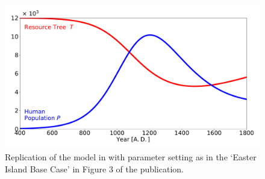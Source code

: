 \begin{figure}
	\centering
	\includegraphics[width=1 \textwidth]{images/Brander1998Model_EI_reduced}
	\caption{Replication of the model in \citet{Brander1998} with parameter setting as in the `Easter Island Base Case' in Figure 3 of the publication. %
	}
	\label{fig:brander1998eibasecase}
\end{figure}

